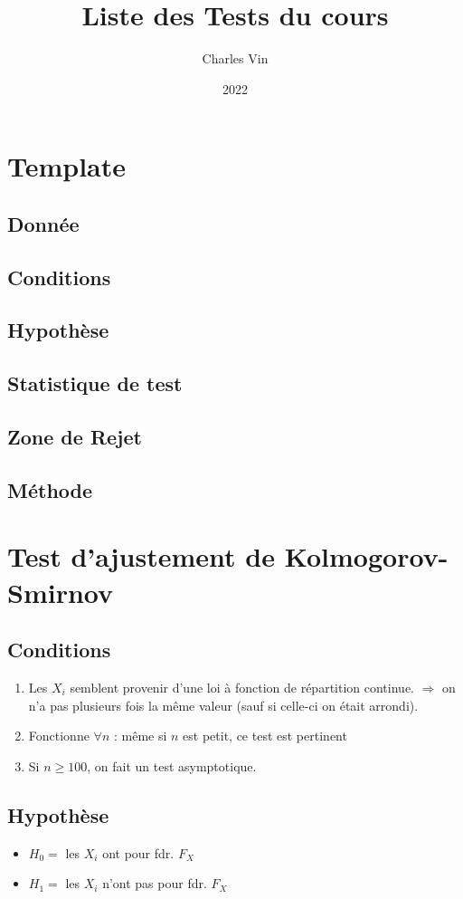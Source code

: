 \documentclass{article}
\title{Liste des Tests du cours}
\author{Charles Vin}
\date{2022}
\theoremstyle{plain}%
\theoremstyle{definition}
\theoremstyle{remark}
\begin{document}
\maketitle
\tableofcontents

\section{Template}
\subsection*{Donnée}
\subsection*{Conditions}
\subsection*{Hypothèse}
\subsection*{Statistique de test}
\subsection*{Zone de Rejet}
\subsection*{Méthode}

\section{Test d'ajustement de Kolmogorov-Smirnov}


\subsection*{Conditions}
\begin{enumerate}
    \item Les $ X_i $ semblent provenir d'une loi à fonction de répartition continue. $ \Rightarrow  $ on n'a pas plusieurs fois la même valeur (sauf si celle-ci on était arrondi).
    \item Fonctionne $ \forall n $ : même si $ n $ est petit, ce test est pertinent
    \item Si $ n \geq 100 $, on fait un test asymptotique.
\end{enumerate}

\subsection*{Hypothèse}
\begin{itemize}
    \item $ H_0 = $ les $ X_i $ ont pour fdr. $ F_X $ 
    \item $ H_1 = $ les $ X_i $ n'ont pas pour fdr. $ F_X $ 
\end{itemize}
\end{document}
